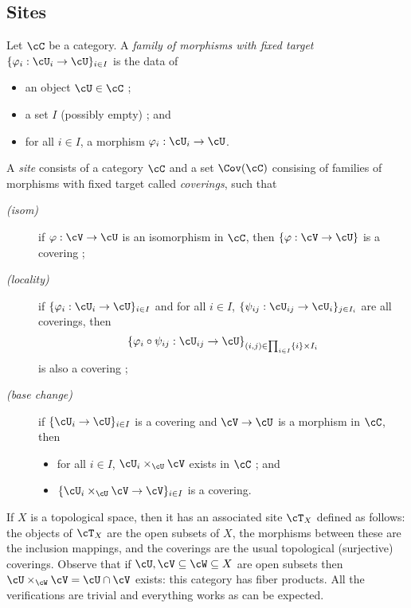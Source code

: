\subsection{Sites}

\begin{defi}
Let $\cC$ be a category. A \emph{family of morphisms with fixed target} $\{\varphi_i : \cU_i \to \cU \}_{i\in I}$ is the data of
\begin{itemize} 
\item an object $\cU \in \cC$ ; 
\item a set $I$ (possibly empty) ; and 
\item for all $i\in I$, a morphism $\varphi_i : \cU_i \to \cU$. 
\end{itemize}
A \emph{site} consists of a category $\cC$ and a set $\Cov(\cC)$ consising of families of morphisms with fixed target called \emph{coverings}, such that
\begin{description}
\item[\it(isom)]
if $\varphi : \cV \to \cU$ is an isomorphism in $\cC$, then $\{\varphi : \cV \to \cU\}$ is a covering ;
\item[\it(locality)]
if $\{\varphi_i : \cU_i \to \cU \}_{i\in I}$ and for all $i \in I$, $\{\psi_{ij} : \cU_{ij} \to \cU_i \}_{j\in I_i}$ are all coverings, then $$\{\varphi_i \circ \psi_{ij} : \cU_{ij} \to \cU \}_{(i,j)\in \prod_{i\in I} \{i\} \times I_i}$$ is also a covering ;
\item[\it(base change)]
if $\{\cU_i \to \cU \}_{i\in I}$ is a covering and $\cV \to \cU$ is a morphism in $\cC$, then
\begin{itemize}
\item for all $i \in I$, $\cU_i \times_\cU \cV$ exists in $\cC$ ; and
\item  $\{\cU_i \times_\cU \cV \to \cV \}_{i\in I}$ is a covering.
\end{itemize}
\end{description}
\end{defi}

\begin{example}
If $X$ is a topological space, then it has an associated site $\cT_X$ defined as follows: the objects of $\cT_X$ are the open subsets of $X$, the morphisms between these are the inclusion mappings, and the coverings are the usual topological (surjective) coverings. Observe that if $\cU, \cV \subseteq \cW \subseteq X$ are open subsets then $\cU \times_\cW \cV = \cU \cap \cV$ exists: this category has fiber products. All the verifications are trivial and everything works as can be expected. 
\end{example}

